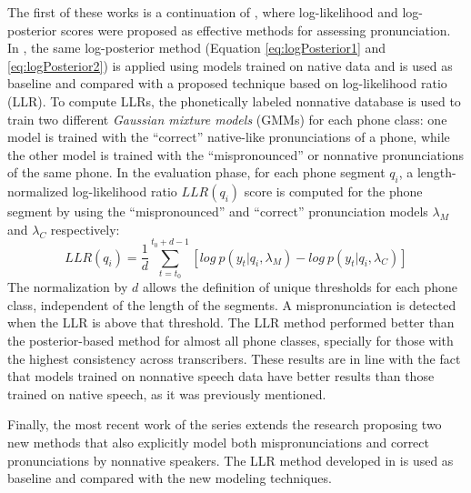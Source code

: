 The first of these works \cite{detection_phone_level_mispronunciation_learning} is 
a continuation of \cite{pronunciation_scoring_phone_segments_instruction}, 
where log-likelihood and log-posterior scores were proposed as effective methods for 
assessing pronunciation. In \cite{detection_phone_level_mispronunciation_learning}, 
the same log-posterior method (Equation \ref{eq:logPosterior1} and \ref{eq:logPosterior2}) 
is applied using models trained on native
data and is used as baseline and compared with a proposed technique 
based on log-likelihood ratio (LLR).
To compute LLRs, the phonetically labeled nonnative
database is used to train two different \textit{Gaussian mixture models} (GMMs) for each phone
class: one model is trained with the ``correct'' native-like pronunciations of a phone, while the
other model is trained with the ``mispronounced'' or nonnative pronunciations of the same phone.
In the evaluation phase, for each phone segment $q_{i}$, a length-normalized log-likelihood ratio
$LLR(q_{i})$ score is computed for the phone segment by using the ``mispronounced'' and ``correct''
pronunciation models $\lambda_{M}$ and $\lambda_{C}$ respectively:
\begin{equation}
\label{eq:logLikelihoodRatio}
LLR(q_{i}) = \frac{1}{d}\sum_{t=t_{0}}^{t_{0}+d-1} [log \ p(y_{t}|q_{i}, \lambda_{M}) - log \ p(y_{t}|q_{i}, \lambda_{C})]
\end{equation}
The normalization by $d$ allows the definition of unique thresholds for each phone class, 
independent of the length of the segments. A mispronunciation is detected when the LLR is above that threshold. 
The LLR method performed better than the posterior-based method for almost all phone classes, 
specially for those with the highest consistency across transcribers. These results are in
line with the fact that models trained on nonnative speech data have better results than
those trained on native speech, as it was previously mentioned.

Finally, the most recent work of the series \cite{main} extends the research 
proposing two new methods that also explicitly model both mispronunciations and correct pronunciations 
by nonnative speakers. The LLR method developed in 
\cite{detection_phone_level_mispronunciation_learning} is used as baseline and compared with
the new modeling techniques. 

